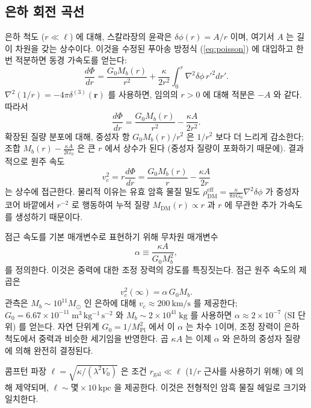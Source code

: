 \documentclass[12pt,a4paper]{article}
\begin{document}
	\subsection{은하 회전 곡선}
	은하 척도 (\(r \ll \ell\)) 에 대해, 스칼라장의 윤곽은 \(\delta\phi(r) = A/r\) 이며, 여기서 \(A\) 는 길이 차원을 갖는 상수이다. 이것을 수정된 푸아송 방정식 (\ref{eq:poisson}) 에 대입하고 한 번 적분하면 동경 가속도를 얻는다:
	\[
	\frac{d\Phi}{dr} = \frac{G_0 M_b(r)}{r^2} + \frac{\kappa}{2r^2} \int_0^r \nabla^2\delta\phi \, r'^2 dr'.
	\]
	\(\nabla^2(1/r) = -4\pi\delta^{(3)}(\mathbf{r})\) 를 사용하면, 임의의 \(r>0\) 에 대해 적분은 \(-A\) 와 같다. 따라서
	\[
	\frac{d\Phi}{dr} = \frac{G_0 M_b(r)}{r^2} - \frac{\kappa A}{2r^2}.
	\]
	확장된 질량 분포에 대해, 중성자 항 \(G_0 M_b(r)/r^2\) 은 \(1/r^2\) 보다 더 느리게 감소한다; 조합 \(M_b(r) - \frac{\kappa A}{2G_0}\) 은 큰 \(r\) 에서 상수가 된다 (중성자 질량이 포화하기 때문에). 결과적으로 원주 속도
	\[
	v_c^2 = r\frac{d\Phi}{dr} = \frac{G_0 M_b(r)}{r} - \frac{\kappa A}{2r}
	\]
	는 상수에 접근한다. 물리적 이유는 유효 암흑 물질 밀도 \(\rho_{\mathrm{DM}}^{\mathrm{eff}} = \frac{\kappa}{8\pi G_0} \nabla^2\delta\phi\) 가 중성자 코어 바깥에서 \(r^{-2}\) 로 행동하여 누적 질량 \(M_{\mathrm{DM}}(r) \propto r\) 과 \(r\) 에 무관한 추가 가속도를 생성하기 때문이다.
	
	점근 속도를 기본 매개변수로 표현하기 위해 무차원 매개변수
	\begin{equation}
		\alpha \equiv \frac{\kappa A}{G_0 M_b^2},
		\label{eq:alpha}
	\end{equation}
	를 정의한다. 이것은 중력에 대한 조정 장력의 강도를 특징짓는다. 점근 원주 속도의 제곱은
	\begin{equation}
		v_c^2(\infty) = \alpha\, G_0 M_b.
		\label{eq:vc-squared}
	\end{equation}
	관측은 \(M_b \sim 10^{11}M_\odot\) 인 은하에 대해 \(v_c \approx 200\ \mathrm{km/s}\) 를 제공한다; \(G_0 = 6.67\times 10^{-11}\ \mathrm{m^3\,kg^{-1}\,s^{-2}}\) 와 \(M_b \sim 2\times 10^{41}\ \mathrm{kg}\) 를 사용하면 \(\alpha \approx 2 \times 10^{-7}\) (SI 단위) 를 얻는다. 자연 단위계 \(G_0 = 1/M_{\mathrm{Pl}}^2\) 에서 이 \(\alpha\) 는 차수 1이며, 조정 장력이 은하 척도에서 중력과 비슷한 세기임을 반영한다. 곱 \(\kappa A\) 는 이제 \(\alpha\) 와 은하의 중성자 질량에 의해 완전히 결정된다.
	
	콤프턴 파장 \(\ell = \sqrt{\kappa/(\lambda^2 V_0)}\) 은 조건 \(r_{\mathrm{gal}} \ll \ell\) (\(1/r\) 근사를 사용하기 위해) 에 의해 제약되며, \(\ell \sim \text{몇}\times 10\ \mathrm{kpc}\) 을 제공한다. 이것은 전형적인 암흑 물질 헤일로 크기와 일치한다.
	
\end{document}
